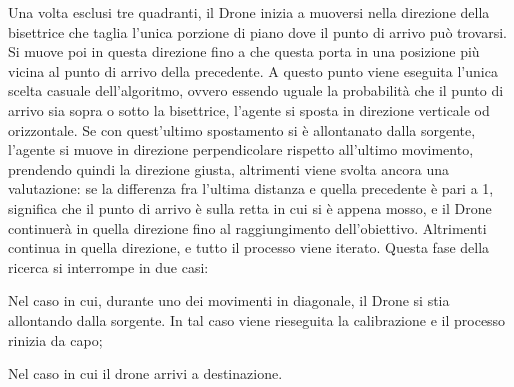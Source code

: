 Una volta esclusi tre quadranti, il Drone inizia a muoversi nella direzione della bisettrice che taglia l'unica porzione di piano dove il punto di arrivo può trovarsi. Si muove poi in questa direzione fino a che questa porta in una posizione più vicina al punto di arrivo della precedente. A questo punto viene eseguita l'unica scelta casuale dell'algoritmo, ovvero essendo uguale la probabilità che il punto di arrivo sia sopra o sotto la bisettrice, l'agente si sposta in direzione verticale od orizzontale. Se con quest'ultimo spostamento si è allontanato dalla sorgente, l'agente si muove in direzione perpendicolare rispetto all'ultimo movimento, prendendo quindi la direzione giusta, altrimenti viene svolta ancora una valutazione: se la differenza fra l'ultima distanza e quella precedente è pari a 1, significa che il punto di arrivo è sulla retta in cui si è appena mosso, e il Drone continuerà in quella direzione fino al raggiungimento dell'obiettivo. Altrimenti continua in quella direzione, e tutto il processo viene iterato. Questa fase della ricerca si interrompe in due casi: 

Nel caso in cui, durante uno dei movimenti in diagonale, il Drone si stia allontando dalla sorgente. In tal caso viene rieseguita la calibrazione e il processo rinizia da capo;

Nel caso in cui il drone arrivi a destinazione.
